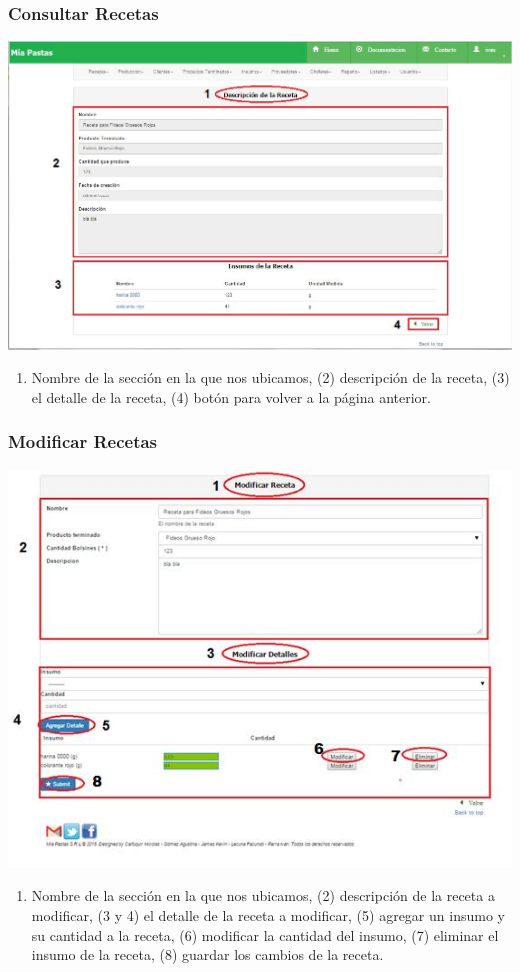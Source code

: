 \documentclass[letterpaper,10pt,english]{sphinxmanual}
\begin{document}
\subsubsection{Consultar Recetas}
\label{recetas:consultar-recetas}
\includegraphics{receta_detalle.jpg}
\begin{enumerate}
\item {} 
Nombre de la sección en la que nos ubicamos, (2) descripción de la receta, (3) el detalle de la receta, (4) botón para volver a la página anterior.

\end{enumerate}


\subsubsection{Modificar Recetas}
\label{recetas:modificar-recetas}
\includegraphics{receta_modificar.jpg}
\begin{enumerate}
\item {} 
Nombre de la sección en la que nos ubicamos, (2) descripción de la receta a modificar, (3 y 4) el detalle de la receta a modificar, (5) agregar un insumo y su cantidad a la receta, (6) modificar la cantidad del insumo, (7) eliminar el insumo de la receta, (8) guardar los cambios de la receta.

\end{enumerate}
\end{document}
